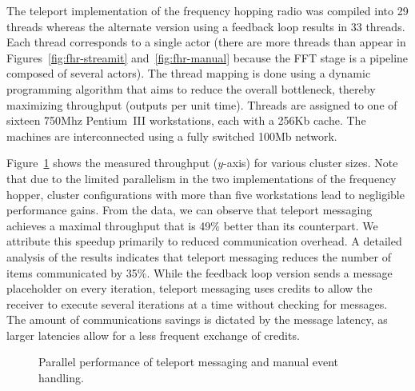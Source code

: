 The teleport implementation of the frequency hopping radio was
compiled into 29 threads whereas the alternate version using a
feedback loop results in 33 threads.  Each thread corresponds to a
single actor (there are more threads than appear in
Figures~\ref{fig:fhr-streamit} and~\ref{fig:fhr-manual} because the
FFT stage is a pipeline composed of several actors).  The thread
mapping is done using a dynamic programming algorithm that aims to
reduce the overall bottleneck, thereby maximizing throughput (outputs
per unit time).  Threads are assigned to one of sixteen 750Mhz
Pentium~III workstations, each with a 256Kb cache.  The machines are
interconnected using a fully switched 100Mb network.

Figure~\ref{fig:fhr-throughput} shows the measured throughput
($y$-axis) for various cluster sizes.  Note that due to the limited
parallelism in the two implementations of the frequency hopper,
cluster configurations with more than five workstations lead to
negligible performance gains. From the data, we can observe that
teleport messaging achieves a maximal throughput that is 49\% better
than its counterpart.  We attribute this speedup primarily to reduced
communication overhead.  A detailed analysis of the results indicates
that teleport messaging reduces the number of items communicated by
35\%.  While the feedback loop version sends a message placeholder on
every iteration, teleport messaging uses credits to allow the receiver
to execute several iterations at a time without checking for messages.
The amount of communications savings is dictated by the message
latency, as larger latencies allow for a less frequent exchange of
credits.

\begin{figure}[t]
\centering
\vspace{-10pt}
\vspace{-10pt}
\caption{Parallel performance of teleport messaging and manual event
  handling.  \protect\label{fig:fhr-throughput}}
\vspace{-6pt}
\end{figure}



